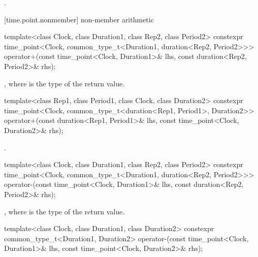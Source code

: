 \begin{itemdescr}
\pnum
\returns {}.
\end{itemdescr}

[time.point.nonmember]{ non-member arithmetic}

%
%
\begin{itemdecl}
template<class Clock, class Duration1, class Rep2, class Period2>
  constexpr time_point<Clock, common_type_t<Duration1, duration<Rep2, Period2>>>
    operator+(const time_point<Clock, Duration1>& lhs, const duration<Rep2, Period2>& rhs);
\end{itemdecl}

\begin{itemdescr}
\pnum
\returns {}, where  is the type of the return value.
\end{itemdescr}

%
%
\begin{itemdecl}
template<class Rep1, class Period1, class Clock, class Duration2>
  constexpr time_point<Clock, common_type_t<duration<Rep1, Period1>, Duration2>>
    operator+(const duration<Rep1, Period1>& lhs, const time_point<Clock, Duration2>& rhs);
\end{itemdecl}

\begin{itemdescr}
\pnum
\returns {}.
\end{itemdescr}

%
%
\begin{itemdecl}
template<class Clock, class Duration1, class Rep2, class Period2>
  constexpr time_point<Clock, common_type_t<Duration1, duration<Rep2, Period2>>>
    operator-(const time_point<Clock, Duration1>& lhs, const duration<Rep2, Period2>& rhs);
\end{itemdecl}

\begin{itemdescr}
\pnum
\returns {},
where  is the type of the return value.
\end{itemdescr}

%
\begin{itemdecl}
template<class Clock, class Duration1, class Duration2>
  constexpr common_type_t<Duration1, Duration2>
    operator-(const time_point<Clock, Duration1>& lhs, const time_point<Clock, Duration2>& rhs);
\end{itemdecl}

